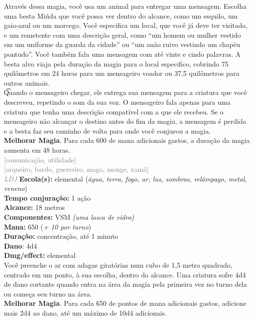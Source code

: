 \documentclass{RPG_Adventure}[2021/10/20]
\begin{document}
{\normalsize Através dessa magia, você usa um animal para entregar uma mensagem. Escolha uma besta Miúda que você possa ver dentro do alcance, como um esquilo, um gaio-azul ou um morcego. Você especifica um local, que você já deve ter visitado, e um remetente com uma descrição geral, como “um homem ou mulher vestido em um uniforme da guarda da cidade” ou “um anão ruivo vestindo um chapéu pontudo”. Você também fala uma mensagem com até vinte e cindo palavras. A besta alvo viaja pela duração da magia para o local especifico, cobrindo 75 quilômetros em 24 horas para um mensageiro voador ou 37,5 quilômetros para outros animais.\\\t Quando o mensageiro chegar, ele entrega sua mensagem para a criatura que você descreveu, repetindo o som da sua voz. O mensageiro fala apenas para uma criatura que tenha uma descrição compatível com a que ele recebeu. Se o mensageiro não alcançar o destino antes do fim da magia, a mensagem é perdida e a besta faz seu caminho de volta para onde você conjurou a magia.\\\t \textbf{Melhorar Magia}. Para cada 600 de mana adicionais gastos, a duração da magia aumenta em 48 horas.\\}
{\scriptsize \textcolor{gray}{[comunicação, utilidade]\\}}
{\scriptsize \textcolor{gray}{[arqueiro, bardo, guerreiro, mago, monge, xamã]\\}}
{\tiny \textcolor{gray}{\textit{LDJ}}}\jump{}
{\small \t \textbf{Escola(s):} elemental (\textit{água, terra, fogo, ar, luz, sombras, relâmpago, metal, veneno})\\\t \textbf{Tempo conjuração:} 1 ação\\\t \textbf{Alcance:} 18 metros\\\t \textbf{Componentes:} VSM \textit{(uma lasca de vidro)}\\\t \textbf{Mana:} 650 (\textit{+ 10 por turno})\\\t \textbf{Duração:} concentração, até 1 minuto\\\t \textbf{Dano}: 4d4\\\t \textbf{Dmg/effect:} elemental\\}
{\normalsize Você preenche o ar com adagas giratórias num cubo de 1,5 metro quadrado, centrado em um ponto, à sua escolha, dentro do alcance. Uma criatura sofre 4d4 de dano cortante quando entra na área da magia pela primeira vez no turno dela ou começa seu turno na área.\\\t \textbf{Melhorar Magia}. Para cada 650 de pontos de mana adicionais gastos, adicione mais 2d4 ao dano, até um máximo de 10d4 adicionais.\\}
\end{document}
